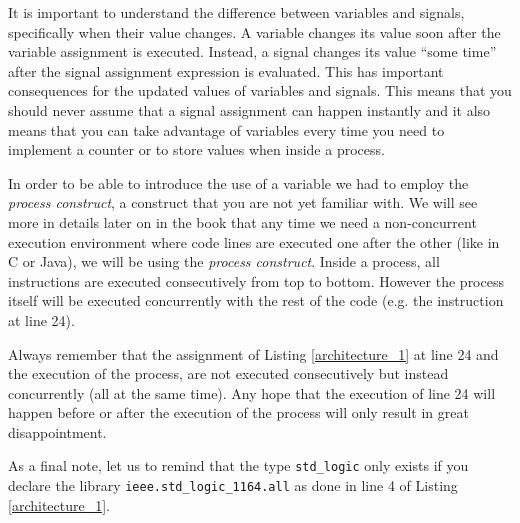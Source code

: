 It is important to understand the difference between variables and signals, specifically when their value changes. A variable changes its value soon after the variable assignment is executed. Instead, a signal changes its value ``some time'' after the signal assignment expression is evaluated. This has important consequences for the updated values of variables and signals. This means that you should never assume that a signal assignment can happen instantly and it also means that you can take advantage of variables every time you need to implement a counter or to store values when inside a process.

In order to be able to introduce the use of a variable we had to employ the \textit{process construct}, a construct that you are not yet familiar with. We will see more in details later on in the book that any time we need a non-concurrent execution environment where code lines are executed one after the other (like in C or Java), we will be using the \textit{process construct}. Inside a process, all instructions are executed consecutively from top to bottom. However the process itself will be executed concurrently with the rest of the code (e.g. the instruction at line 24).

Always remember that the assignment of Listing \ref{architecture_1} at line 24 and the execution of the process, are not executed consecutively but instead concurrently (all at the same time). Any hope that the execution of line 24 will happen before or after the execution of the process will only result in great disappointment. 

As a final note, let us to remind that the type \texttt{std\_logic} only exists if you declare the library \texttt{ieee.std\_logic\_1164.all} as done in line 4 of Listing \ref{architecture_1}.

